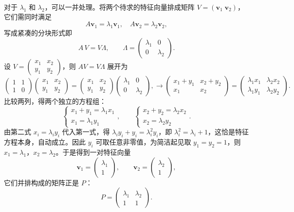 \documentclass[UTF8]{ctexbook}
\begin{document}
对于 $\lambda_1$ 和 $\lambda_2$，可以一并处理。将两个待求的特征向量排成矩阵 $V=(\mathbf{v}_1\;\mathbf{v}_2)$，它们需同时满足
\[
A\mathbf{v}_1=\lambda_1\mathbf{v}_1,\quad A\mathbf{v}_2=\lambda_2\mathbf{v}_2,
\]
写成紧凑的分块形式即
\[
A\,V=V\Lambda,\qquad \Lambda=\begin{pmatrix}\lambda_1&0\\0&\lambda_2\end{pmatrix}.
\]
设 $V=\begin{pmatrix}x_1&x_2\\y_1&y_2\end{pmatrix}$，则 $AV=V\Lambda$ 展开为
\[
\begin{pmatrix}1&1\\1&0\end{pmatrix}
\begin{pmatrix}x_1&x_2\\y_1&y_2\end{pmatrix}
=
\begin{pmatrix}x_1&x_2\\y_1&y_2\end{pmatrix}
\begin{pmatrix}\lambda_1&0\\0&\lambda_2\end{pmatrix},
\rightarrow
\begin{pmatrix}x_1+y_1&x_2+y_2\\x_1&x_2\end{pmatrix}
=
\begin{pmatrix}\lambda_1x_1&\lambda_2x_2\\\lambda_1y_1&\lambda_2y_2\end{pmatrix}.
\]
比较两列，得两个独立的方程组：
\[
\begin{cases}
x_1+y_1=\lambda_1x_1\\
x_1=\lambda_1y_1
\end{cases},\qquad
\begin{cases}
x_2+y_2=\lambda_2x_2\\
x_2=\lambda_2y_2
\end{cases}.
\]
由第二式 $x_i=\lambda_i y_i$ 代入第一式，得 $\lambda_i y_i+y_i=\lambda_i^2 y_i$，即 $\lambda_i^2=\lambda_i+1$，这恰是特征方程本身，自动成立。因此 $y_i$ 可取任意非零值，为简洁起见取 $y_1=y_2=1$，则 $x_1=\lambda_1$，$x_2=\lambda_2$。于是得到一对特征向量
\[
\mathbf{v}_1=\begin{pmatrix}\lambda_1\\1\end{pmatrix},\qquad
\mathbf{v}_2=\begin{pmatrix}\lambda_2\\1\end{pmatrix},
\]
它们并排构成的矩阵正是 $P$：
\[
P=\begin{pmatrix}\lambda_1&\lambda_2\\1&1\end{pmatrix}.
\]
\end{document}
